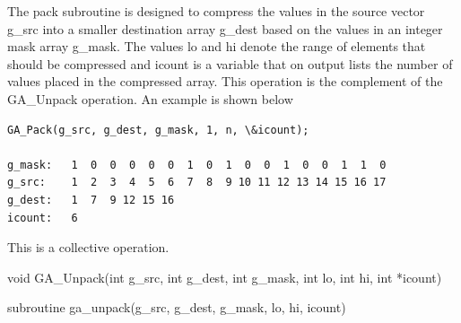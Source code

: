 \documentclass[12pt]{article}
\begin{document}
\begin{desc}

The pack subroutine is designed to compress the values in the source vector g_src into a smaller destination array g_dest based on the values in an integer mask array g_mask. The values lo and hi denote the range of elements that should be compressed and icount is a variable that on output lists the number of values placed in the compressed array. This operation is the complement of the GA_Unpack operation. An example is shown below

\begin{verbatim}
GA_Pack(g_src, g_dest, g_mask, 1, n, \&icount);

g_mask:   1  0  0  0  0  0  1  0  1  0  0  1  0  0  1  1  0
g_src:    1  2  3  4  5  6  7  8  9 10 11 12 13 14 15 16 17
g_dest:   1  7  9 12 15 16
icount:   6
\end{verbatim}

This is a collective operation.
\end{desc}


\begin{capi}
\begin{ccode}
void GA_Unpack(int g_src, int g_dest, int g_mask, int lo, int hi,
               int *icount)
\end{ccode}
\begin{funcargs}
\end{funcargs}
\end{capi}

\begin{fapi}
\begin{fcode}
subroutine ga_unpack(g_src, g_dest, g_mask, lo, hi, icount)
\end{fcode}
\begin{funcargs}
\end{funcargs}
\end{fapi}
\end{document}
